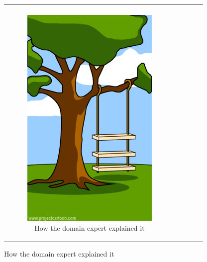 \documentclass[runningheads,a4paper]{llncs}
\begin{document}
\begin{figure}[h]
\begin{center}
\begin{tabular}{|c|c|c|c|c|}\hline
&&&&\\
\begin{subfigure}[t]{0.15\textwidth}\centering\includegraphics[width=0.9\columnwidth]{images/howexplained}
\caption*{\tiny \centering How the domain expert explained it}\label{fig:howexplained}\end{subfigure}&

\end{tabular}
\end{center}
\end{figure}
\end{document}
